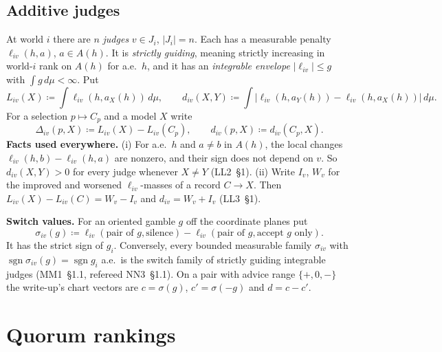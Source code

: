 \documentclass[11pt]{article}
\theoremstyle{definition}
\theoremstyle{remark}
\newcommand{\src}[1]{\textsf{#1}}
\begin{document}
\subsection{Additive judges}
At world $i$ there are $n$ \emph{judges} $v\in J_i$, $|J_i|=n$. Each has a measurable penalty $\ell_{iv}(h,a)$, $a\in A(h)$. It is \emph{strictly guiding}, meaning strictly increasing in world-$i$ rank on $A(h)$ for a.e.\ $h$, and it has an \emph{integrable envelope} $|\ell_{iv}|\le g$ with $\int g\,d\mu<\infty$. Put
\[
L_{iv}(X)\coloneqq\int\ell_{iv}(h,a_X(h))\,d\mu,\qquad
d_{iv}(X,Y)\coloneqq\int\bigl|\ell_{iv}(h,a_Y(h))-\ell_{iv}(h,a_X(h))\bigr|\,d\mu .
\]
For a selection $p\mapsto C_p$ and a model $X$ write
\[
\Delta_{iv}(p,X)\coloneqq L_{iv}(X)-L_{iv}(C_p),\qquad d_{iv}(p,X)\coloneqq d_{iv}(C_p,X).
\]
\textbf{Facts used everywhere.} (i) For a.e.\ $h$ and $a\ne b$ in $A(h)$, the local changes $\ell_{iv}(h,b)-\ell_{iv}(h,a)$ are nonzero, and their sign does not depend on $v$. So $d_{iv}(X,Y)>0$ for every judge whenever $X\ne Y$ (\src{LL2}~\S1). (ii) Write $I_v$, $W_v$ for the improved and worsened $\ell_{iv}$-masses of a record $C\to X$. Then $L_{iv}(X)-L_{iv}(C)=W_v-I_v$ and $d_{iv}=W_v+I_v$ (\src{LL3}~\S1).

\textbf{Switch values.} For an oriented gamble $g$ off the coordinate planes put
\[
\sigma_{iv}(g)\coloneqq\ell_{iv}(\text{pair of }g,\text{silence})-\ell_{iv}(\text{pair of }g,\text{accept }g\text{ only}).
\]
It has the strict sign of $g_i$. Conversely, every bounded measurable family $\sigma_{iv}$ with $\operatorname{sgn}\sigma_{iv}(g)=\operatorname{sgn}g_i$ a.e.\ is the switch family of strictly guiding integrable judges (\src{MM1}~\S1.1, refereed \src{NN3}~\S1.1). On a pair with advice range $\{+,0,-\}$ the write-up's chart vectors are $c=\sigma(g)$, $c'=\sigma(-g)$ and $d=c-c'$.

\section{Quorum rankings}\label{sec:quorum}
\end{document}
